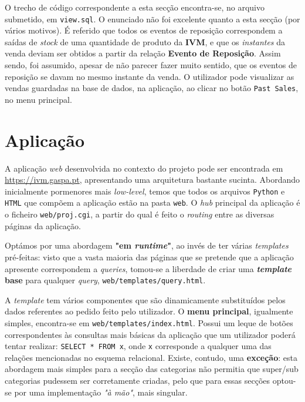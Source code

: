 \documentclass[12pt,a4paper]{article}
\begin{document}
O trecho de código correspondente a esta secção encontra-se, no arquivo submetido,
em \texttt{view.sql}. O enunciado não foi excelente quanto a esta secção (por vários motivos).
É referido que todos os eventos de reposição correspondem a saídas de \textit{stock} de uma
quantidade de produto da \textbf{IVM}, e que os \textit{instantes} da venda
deviam ser obtidos a partir da relação \textbf{Evento de Reposição}. Assim sendo,
foi assumido, apesar de não parecer fazer muito sentido, que os eventos de reposição
se davam no mesmo instante da venda. O utilizador pode visualizar as vendas guardadas
na base de dados, na aplicação, ao clicar no botão \texttt{Past Sales}, no menu principal.

\section*{Aplicação}

A aplicação \textit{web} desenvolvida no contexto do projeto pode ser encontrada
em \url{https://ivm.gaspa.pt}, apresentando uma arquitetura bastante sucinta.
Abordando inicialmente pormenores mais \textit{low-level}, temos que todos os arquivos
\texttt{Python} e \texttt{HTML} que compõem a aplicação estão na pasta \texttt{web}.
O \textit{hub} principal da aplicação é o ficheiro \texttt{web/proj.cgi}, a partir do qual
é feito o \textit{routing} entre as diversas páginas da aplicação.

Optámos por uma abordagem \textbf{"em \textit{runtime}"}, ao invés de ter várias \textit{templates}
pré-feitas: visto que a vasta maioria das páginas que se pretende que a aplicação
apresente correspondem a \textit{queries}, tomou-se a liberdade de criar uma
\textbf{\textit{template} base} para qualquer \textit{query}, \texttt{web/templates/query.html}.

A \textit{template} tem vários componentes que são dinamicamente substituídos
pelos dados referentes ao pedido feito pelo utilizador. O \textbf{menu principal},
igualmente simples, encontra-se em \texttt{web/templates/index.html}. Possui um
leque de botões correspondentes às consultas mais básicas da aplicação que um
utilizador poderá tentar realizar: \texttt{SELECT * FROM x}, onde \texttt{x} corresponde a qualquer
uma das relações mencionadas no esquema relacional. Existe, contudo, uma \textbf{exceção}:
esta abordagem mais simples para a secção das categorias não permitia que
super/sub categorias pudessem ser corretamente criadas, pelo que para essas secções
optou-se por uma implementação \textit{"à mão"}, mais singular.
\end{document}
